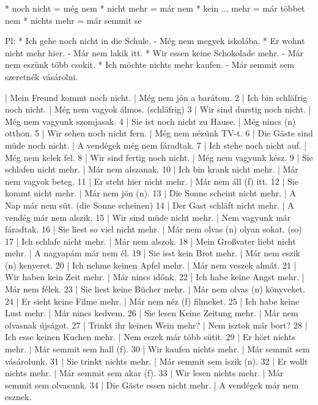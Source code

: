 \documentclass{article}
\newenvironment{desc}{\verbatim}{\endverbatim}
\newenvironment{exmp}{\verbatim}{\endverbatim}
\begin{document}
\begin{desc}
* noch nicht = még nem
* nicht mehr = már nem
* kein ... mehr = már többet nem
* nichts mehr = már semmit se

Pl: * Ich gehe noch nicht in die Schule. - Még nem megyek iskolába.
* Er wohnt nicht mehr hier. - Már nem lakik itt.
* Wir essen keine Schokolade mehr. - Már nem eszünk több csokit.
* Ich möchte nichts mehr kaufen. - Már semmit sem szeretnék vásárolni.
\end{desc}

\begin{exmp}
1 | Mein Freund kommt noch nicht. | Még nem jön a barátom.
2 | Ich bin schläfrig noch nicht. | Még nem vagyok álmos. (schläfrig)
3 | Wir sind durstig noch nicht. | Még nem vagyunk szomjasak.
4 | Sie ist noch nicht zu Hause. | Még nincs (n) otthon.
5 | Wir sehen noch nicht fern. | Még nem nézünk TV-t.
6 | Die Gäste sind müde noch nicht. | A vendégek még nem fáradtak.
7 | Ich stehe noch nicht auf. | Még nem kelek fel.
8 | Wir sind fertig noch nicht. | Még nem vagyunk kész.
9 | Sie schlafen nicht mehr. | Már nem alszanak.
10 | Ich bin krank nicht mehr. | Már nem vagyok beteg.
11 | Er steht hier nicht mehr. | Már nem áll (f) itt.
12 | Sie kommt nicht mehr. | Már nem jön (n).
13 | Die Sonne scheint nicht mehr. | A Nap már nem süt. (die Sonne scheinen)
14 | Der Gast schläft nicht mehr. | A vendég már nem alszik.
15 | Wir sind müde nicht mehr. | Nem vagyunk már fáradtak.
16 | Sie liest so viel nicht mehr. | Már nem olvas (n) olyan sokat. (so)
17 | Ich schlafe nicht mehr. | Már nem alszok.
18 | Mein Großvater liebt nicht mehr. | A nagyapám már nem él.
19 | Sie isst kein Brot mehr. | Már nem eszik (n) kenyeret.
20 | Ich nehme keinen Apfel mehr. | Már nem veszek almát.
21 | Wir haben kein Zeit mehr. | Már nincs időnk.
22 | Ich habe keine Angst mehr. | Már nem félek.
23 | Sie liest keine Bücher mehr. | Már nem olvas (n) könyveket.
24 | Er sieht keine Filme mehr. | Már nem néz (f) filmeket.
25 | Ich habe keine Lust mehr. | Már nincs kedvem.
26 | Sie lesen Keine Zeitung mehr. | Már nem olvasnak újságot.
27 | Trinkt ihr keinen Wein mehr? | Nem isztok már bort?
28 | Ich esse keinen Kuchen mehr. | Nem eszek már több sütit.
29 | Er hört nichts mehr. | Már semmit sem hall (f).
30 | Wir kaufen nichts mehr. | Már semmit sem vásárolunk.
31 | Sie trinkt nichts mehr. | Már semmit sem iszik (n).
32 | Er wollt nichts mehr. | Már semmit sem akar (f).
33 | Wir lesen nichts mehr. | Már semmit sem olvasunk.
34 | Die Gäste essen nicht mehr. | A vendégek már nem esznek.
\end{exmp}
\end{document}
